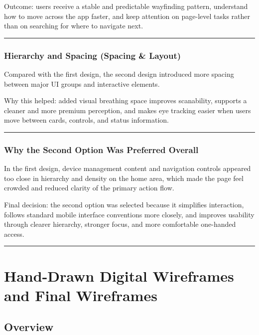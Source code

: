 \documentclass[12pt, a4paper]{report}
\newenvironment{highlight}{%
  \par\vspace{6pt}%
  \noindent%
  \begin{lrbox}{\hlbox}%
    \begin{minipage}{\dimexpr\linewidth-14pt\relax}%
      \vspace{6pt}\small%
}{%
      \vspace{6pt}%
    \end{minipage}%
  \end{lrbox}%
  \noindent\colorbox{lightgray}{%
    \hspace{2pt}%
    \textcolor{accentblue}{\rule[-0.2\baselineskip]{2pt}{\dimexpr\ht\hlbox+\dp\hlbox\relax}}%
    \hspace{8pt}\usebox{\hlbox}\hspace{2pt}%
  }%
  \par\vspace{6pt}%
}
\begin{document}
\begin{highlight}
Outcome: users receive a stable and predictable wayfinding pattern, understand how
to move across the app faster, and keep attention on page-level tasks rather than
on searching for where to navigate next.
\end{highlight}

\subsection{Hierarchy and Spacing (Spacing \& Layout)}

Compared with the first design, the second design introduced more spacing between
major UI groups and interactive elements.

\begin{highlight}
Why this helped: added visual breathing space improves scanability, supports a
cleaner and more premium perception, and makes eye tracking easier when users move
between cards, controls, and status information.
\end{highlight}

\subsection{Why the Second Option Was Preferred Overall}

In the first design, device management content and navigation controls appeared too
close in hierarchy and density on the home area, which made the page feel crowded
and reduced clarity of the primary action flow.

\begin{highlight}
Final decision: the second option was selected because it simplifies interaction,
follows standard mobile interface conventions more closely, and improves usability
through clearer hierarchy, stronger focus, and more comfortable one-handed access.
\end{highlight}

\chapter{Hand-Drawn Digital Wireframes and Final Wireframes}

\section{Overview}
\end{document}
